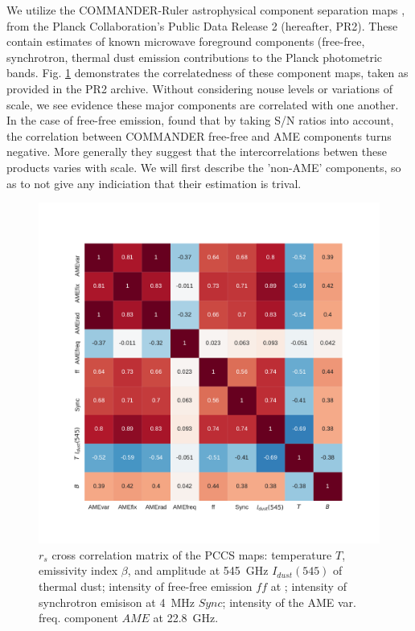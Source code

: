        We utilize the COMMANDER-Ruler astrophysical component separation maps \citep{planckXII}, from the Planck Collaboration's Public Data Release 2 (hereafter, PR2)\citep{planck2015I}. These contain estimates of known microwave foreground components (free-free, synchrotron, thermal dust emission contributions to the Planck photometric bands. Fig. \ref{fig:PCCS_corrmatrix} demonstrates the correlatedness of these component maps, taken as provided in the PR2 archive. Without considering nouse levels or variations of scale, we see evidence these major components are correlated with one another. In the case of free-free emission,  \cite{vonHausegger15} found that by taking S/N ratios into account, the correlation between COMMANDER free-free and AME components turns negative. More generally they suggest that the intercorrelations betwen these products varies with scale. We will first describe the 'non-AME' components, so as to not give any indiciation that their estimation is trival.

       \begin{figure}
         \includegraphics[width=\textwidth]{../Plots/ch_datasources/PCCS_corrmatrix.pdf}
         \centering
         \caption{$r_{s}$ cross correlation matrix of the PCCS maps: temperature $T$, emissivity index $\beta$, and amplitude at 545~GHz $I_{dust}(545)$ of thermal dust; intensity of free-free emission $ff$ at ; intensity of synchrotron emisison at 4~MHz $Sync$; intensity of the AME var. freq. component $AME$ at 22.8~GHz.}
         \label{fig:PCCS_corrmatrix}
       \end{figure}

